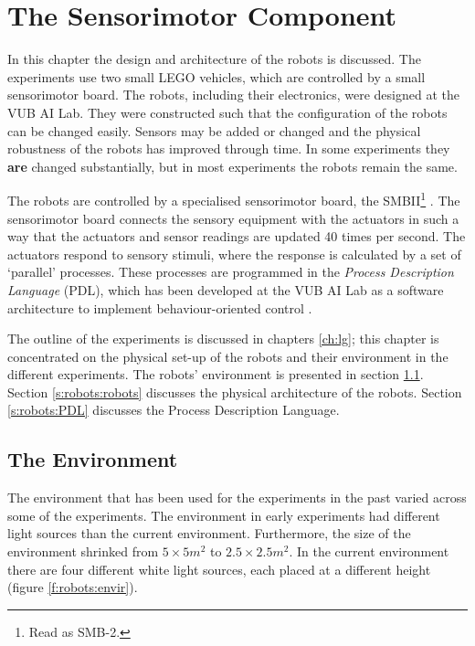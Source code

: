 \chapter{The Sensorimotor Component}\label{ch:robots}

In this chapter the design and architecture of the robots is discussed. The experiments use two small LEGO vehicles, which are controlled by a small sensorimotor board. The robots, including their electronics, were designed at the VUB AI Lab. They were constructed such that the configuration of the robots can be changed easily. Sensors may be added or changed and the physical robustness of the robots has improved through time. In some experiments they {\bf are} changed substantially, but in most experiments the robots remain the same.

The robots are controlled by a specialised sensorimotor board, the SMBII\footnote{Read as SMB-2.} \citep{vereertbrugghen:1996}. The sensorimotor board connects the sensory equipment with the actuators in such a way that the actuators and sensor readings are updated 40 times per second. The actuators respond to sensory stimuli, where the response is calculated by a set of `parallel' processes. These processes are programmed in the {\em Process Description Language} (PDL), which has been developed at the VUB AI Lab as a software architecture to implement behaviour-oriented control \citep{steels:1994b}. 

The outline of the experiments is discussed in chapters \ref{ch:lg}; this chapter is concentrated on the physical set-up of the robots and their environment in the different experiments. The robots' environment is presented in section \ref{s:robots:envir}. Section \ref{s:robots:robots} discusses the physical architecture of the robots. Section \ref{s:robots:PDL} discusses the Process Description Language. 

\section{The Environment}\label{s:robots:envir}

The environment that has been used for the experiments in the past varied across some of the experiments. The environment in early experiments \citep{steelsvogt:1997,vogt:1998b,vogt:1998a} had different light sources than the current environment. Furthermore, the size of the environment shrinked from $5\times5 m^2$ to $2.5\times2.5 m^2$. In the current environment there are four different white light sources, each placed at a different height (figure \ref{f:robots:envir}).

